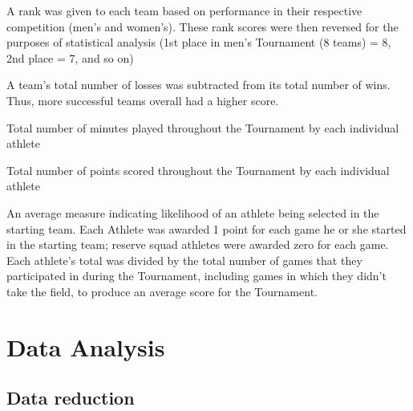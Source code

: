 \begin{CJK}{UTF8}{gbsn}
\begin{description}[labelindent=1cm]
\item [Final Rank:] A rank was given to each team based on performance in their respective competition (men's and women's). These rank scores were then reversed for the purposes of statistical analysis (1st place in men's Tournament (8 teams) = 8, 2nd place = 7, and so on)
\item [Total Wins - Losses:] A team's total number of losses was subtracted from its total number of wins.  Thus, more successful teams overall had a higher score.
\item [Total Minutes:] Total number of minutes played throughout the Tournament by each individual athlete
\item [Total Points:] Total number of points scored throughout the Tournament by each individual athlete
\item [Starting Team Average] An average measure indicating likelihood of an athlete being selected in the starting team. Each Athlete was awarded 1 point for each game he or she started in the starting team; reserve squad athletes were awarded zero for each game. Each athlete's total was divided by the total number of games that they participated in during the Tournament, including games in which they didn't take the field, to produce an average score for the Tournament.
\end{description}







\section{Data Analysis\label{app8:dataAnalysis}}




\subsection{Data reduction\label{app8:dataReduction}}



\end{CJK}
